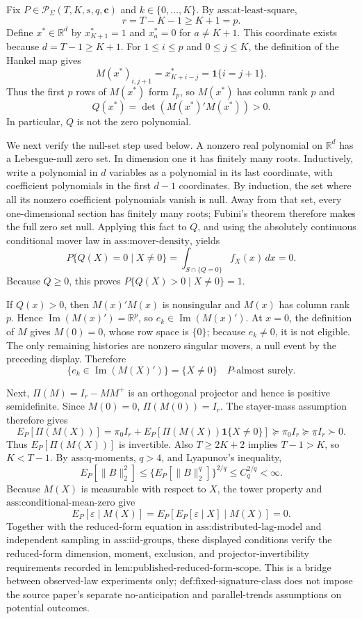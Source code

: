 Fix \(P\in\mathcal P_\Sigma(T,K,s,q,\mathbf c)\) and \(k\in\{0,\ldots,K\}\). By \(\text{ass:at-least-square}\),
\[
r=T-K-1\ge K+1=p.
\]
Define \(x^*\in\mathbb R^d\) by \(x^*_{K+1}=1\) and \(x^*_a=0\) for \(a\ne K+1\). This coordinate exists because \(d=T-1\ge K+1\). For \(1\le i\le p\) and \(0\le j\le K\), the definition of the Hankel map gives
\[
M(x^*)_{i,j+1}=x^*_{K+i-j}=\mathbf 1\{i=j+1\}.
\]
Thus the first \(p\) rows of \(M(x^*)\) form \(I_p\), so \(M(x^*)\) has column rank \(p\) and
\[
Q(x^*)=\det(M(x^*)'M(x^*))>0.
\]
In particular, \(Q\) is not the zero polynomial.

We next verify the null-set step used below. A nonzero real polynomial on \(\mathbb R^d\) has a Lebesgue-null zero set. In dimension one it has finitely many roots. Inductively, write a polynomial in \(d\) variables as a polynomial in its last coordinate, with coefficient polynomials in the first \(d-1\) coordinates. By induction, the set where all its nonzero coefficient polynomials vanish is null. Away from that set, every one-dimensional section has finitely many roots; Fubini's theorem therefore makes the full zero set null. Applying this fact to \(Q\), and using the absolutely continuous conditional mover law in \(\text{ass:mover-density}\), yields
\[
P\{Q(X)=0\mid X\ne0\}
=\int_{S\cap\{Q=0\}}f_X(x)\,dx=0.
\]
Because \(Q\ge0\), this proves \(P\{Q(X)>0\mid X\ne0\}=1\).

If \(Q(x)>0\), then \(M(x)'M(x)\) is nonsingular and \(M(x)\) has column rank \(p\). Hence \(\operatorname{Im}(M(x)')=\mathbb R^p\), so \(e_k\in\operatorname{Im}(M(x)')\). At \(x=0\), the definition of \(M\) gives \(M(0)=0\), whose row space is \(\{0\}\); because \(e_k\ne0\), it is not eligible. The only remaining histories are nonzero singular movers, a null event by the preceding display. Therefore
\[
\{e_k\in\operatorname{Im}(M(X)')\}
=\{X\ne0\}
\quad P\text{-almost surely}.
\]

Next, \(\Pi(M)=I_r-MM^+\) is an orthogonal projector and hence is positive semidefinite. Since \(M(0)=0\), \(\Pi(M(0))=I_r\). The stayer-mass assumption therefore gives
\[
E_P[\Pi(M(X))]
=\pi_0I_r+E_P[\Pi(M(X))\mathbf 1\{X\ne0\}]
\succeq\pi_0I_r
\succeq\underline\pi I_r
\succ0.
\]
Thus \(E_P[\Pi(M(X))]\) is invertible. Also \(T\ge2K+2\) implies \(T-1>K\), so \(K<T-1\). By \(\text{ass:q-moments}\), \(q>4\), and Lyapunov's inequality,
\[
E_P[\lVert B\rVert_2^2]
\le \{E_P[\lVert B\rVert_2^q]\}^{2/q}
\le C_q^{2/q}<\infty.
\]
Because \(M(X)\) is measurable with respect to \(X\), the tower property and \(\text{ass:conditional-mean-zero}\) give
\[
E_P[\varepsilon\mid M(X)]
=E_P\!\left[E_P[\varepsilon\mid X]\mid M(X)\right]=0.
\]
Together with the reduced-form equation in \(\text{ass:distributed-lag-model}\) and independent sampling in \(\text{ass:iid-groups}\), these displayed conditions verify the reduced-form dimension, moment, exclusion, and projector-invertibility requirements recorded in \(\text{lem:published-reduced-form-scope}\). This is a bridge between observed-law experiments only; \(\text{def:fixed-signature-class}\) does not impose the source paper's separate no-anticipation and parallel-trends assumptions on potential outcomes.

